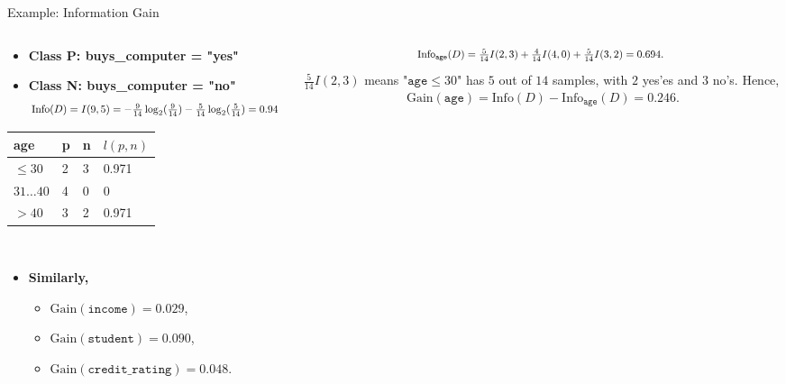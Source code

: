 \begin{frame}{Example: Information Gain}
	\begin{columns}
		\begin{column}{0.45\textwidth}
			\vspace*{-2em}
			\begin{itemize}
				\item \textbf{Class P: buys\_computer = "yes"}
				\item \textbf{Class N: buys\_computer = "no"}
				      \begin{align*}
					      \resizebox{7cm}{!}{%
						      $\text{Info}(D) = I(9,5) = - \frac{9}{14}\log_2(\frac{9}{14})-\frac{5}{14} \log_2(\frac{5}{14}) = 0.94$
					      }
				      \end{align*}
			\end{itemize}
			\centering
			\begin{tabular}{|l|l|l|l|}
				\hline
				\cellcolor{faugray!62}age     & \cellcolor{faugray!62}p & \cellcolor{faugray!62}n & \cellcolor{faugray!62}$l(p,n)$ \\\hline
				\cellcolor{white}$\leq 30$    & 2                       & 3                       & 0.971                          \\\hline
				\cellcolor{white}$31\ldots40$ & 4                       & 0                       & 0                              \\\hline
				\cellcolor{white}$>40$        & 3                       & 2                       & 0.971                          \\\hline
			\end{tabular}\\[0.2cm]
			\begin{itemize}
				\item \textbf{Similarly,}
				      \begin{itemize}
					      \item $\text{Gain}(\texttt{income}) = 0.029$,
					      \item $\text{Gain}(\texttt{student}) = 0.090$,
					      \item $\text{Gain}(\texttt{credit\_rating}) = 0.048$.
				      \end{itemize}
			\end{itemize}
		\end{column}
		\begin{column}{0.45\textwidth}
			\vspace{-1.3cm}
			\begin{align*}
				\resizebox{7cm}{!}{%
				$\text{Info}_{\texttt{age}}(D) = \frac{5}{14}I(2,3) + \frac{4}{14} I(4,0) + \frac{5}{14} I(3,2) = 0.694$.
				}
			\end{align*}
			$\frac{5}{14} I(2,3)$ means "$\texttt{age} \leq 30$" has $5$ out of $14$ samples, with $2$ yes'es and $3$ no's. Hence,
			\begin{align*}
				\text{Gain}(\texttt{age}) = \text{Info}(D)-\text{Info}_{\texttt{age}}(D) = 0.246.
			\end{align*}


\end{column}
\end{columns}
\end{frame}
